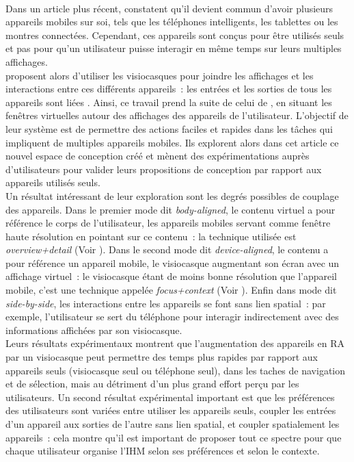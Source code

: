 \paragraph*{}
Dans un article plus récent, \cite{GrubertKranzQuigley2015} constatent qu'il devient commun d'avoir plusieurs appareils mobiles sur soi, tels que les téléphones intelligents, les tablettes ou les montres connectées. Cependant, ces appareils sont conçus pour être utilisés seuls et pas pour qu'un utilisateur puisse interagir en même temps sur leurs multiples affichages.\\
\citeauthor{GrubertKranzQuigley2015} proposent alors d'utiliser les visiocasques pour joindre les affichages et les interactions entre ces différents appareils~: les entrées et les sorties de tous les appareils sont liées . Ainsi, ce travail prend la suite de celui de \citet{EnsFinneganIrani2014}, en situant les fenêtres virtuelles autour des affichages des appareils de l'utilisateur. L'objectif de leur système est de permettre des actions faciles et rapides dans les tâches qui impliquent de multiples appareils mobiles. Ils explorent alors dans cet article ce nouvel espace de conception créé et mènent des expérimentations auprès d'utilisateurs pour valider leurs propositions de conception par rapport aux appareils utilisés seuls.\\
Un résultat intéressant de leur exploration sont les degrés possibles de couplage des appareils. Dans le premier mode dit \emph{body-aligned}, le contenu virtuel a pour référence le corps de l'utilisateur, les appareils mobiles servant comme fenêtre haute résolution en pointant sur ce contenu~: la technique utilisée est \emph{overview+detail} (Voir \citep{BergeSerranoPerelmanEtAl2014}). Dans le second mode dit \emph{device-aligned}, le contenu a pour référence un appareil mobile, le visiocasque augmentant son écran avec un affichage virtuel~: le visiocasque étant de moins bonne résolution que l'appareil mobile, c'est une technique appelée \emph{focus+context} (Voir \cite{BaudischGoodStewart2001}). Enfin dans mode dit \emph{side-by-side}, les interactions entre les appareils se font sans lien spatial~: par exemple, l'utilisateur se sert du téléphone pour interagir indirectement avec des informations affichées par son visiocasque.\\
Leurs résultats expérimentaux montrent que l'augmentation des appareils en RA par un visiocasque peut permettre des temps plus rapides par rapport aux appareils seuls (visiocasque seul ou téléphone seul), dans les taches de navigation et de sélection, mais au détriment d'un plus grand effort perçu par les utilisateurs. Un second résultat expérimental important est que les préférences des utilisateurs sont variées entre utiliser les appareils seuls, coupler les entrées d'un appareil aux sorties de l'autre sans lien spatial, et coupler spatialement les appareils~: cela montre qu'il est important de proposer tout ce spectre pour que chaque utilisateur organise l'IHM selon ses préférences et selon le contexte.\\
